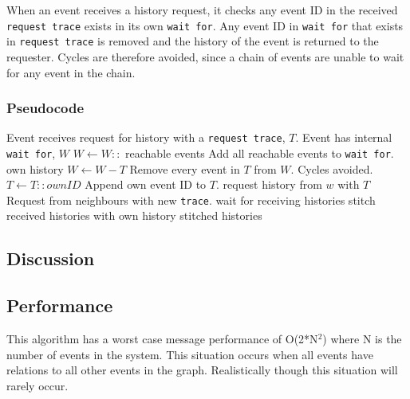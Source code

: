 \newpar When an event receives a history request, it checks any event ID in the received \texttt{request trace} exists in its own \texttt{wait for}. Any event ID in \texttt{wait for} that exists in \texttt{request trace} is removed and the history of the event is returned to the requester. 
Cycles are therefore avoided, since a chain of events are unable to wait for any event in the chain.


\subsubsection*{Pseudocode}
\begin{algorithmic}
	\State Event receives request for history with a \texttt{request trace}, $T$.
	\State Event has internal \texttt{wait for}, $W$
	\State
	\State $W\gets W::$ reachable events \Comment Add all reachable events to \texttt{wait for}.
	\Return own history
	\Else
	\State $W\gets W-T$ \Comment Remove every event in $T$ from $W$. Cycles avoided.
	\State $T\gets T::ownID$ \Comment Append own event ID to $T$.
	\State
	\State request history from $w$ with $T$ \Comment Request from neighbours with new \texttt{trace}.
	\EndFor
	\State wait for receiving histories
	\State stitch received histories with own history
	\State
	\Return stitched histories
	\EndIf
\end{algorithmic}


\subsection{Discussion} %

\subsection{Performance} %
This algorithm has a worst case message performance of O(2*N$^2$) where N is the number of events in the system. This situation occurs when all events have relations to all other events in the graph. Realistically though this situation will rarely occur.